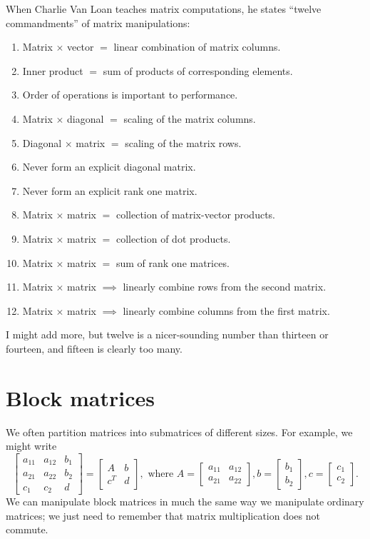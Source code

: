 \documentclass[12pt, leqno]{article}
\begin{document}
When Charlie Van Loan teaches matrix computations, he states
``twelve commandments'' of matrix manipulations:
\begin{enumerate}
\item Matrix $\times$ vector $=$ linear combination of matrix columns.
\item Inner product $=$ sum of products of corresponding elements.
\item Order of operations is important to performance.
\item Matrix $\times$ diagonal $=$ scaling of the matrix columns.
\item Diagonal $\times$ matrix $=$ scaling of the matrix rows.
\item Never form an explicit diagonal matrix.
\item Never form an explicit rank one matrix.
\item Matrix $\times$ matrix $=$ collection of matrix-vector products.
\item Matrix $\times$ matrix $=$ collection of dot products.
\item Matrix $\times$ matrix $=$ sum of rank one matrices.
\item Matrix $\times$ matrix $\implies$ linearly combine rows from
  the second matrix.
\item Matrix $\times$ matrix $\implies$ linearly combine columns from
  the first matrix.
\end{enumerate}
I might add more, but twelve is a nicer-sounding
number than thirteen or fourteen, and fifteen is clearly too many.

\section{Block matrices}

We often partition matrices into submatrices of different
sizes.  For example, we might write
\[
  \begin{bmatrix}
    a_{11} & a_{12} & b_1 \\
    a_{21} & a_{22} & b_2 \\
    c_1 & c_2 & d
  \end{bmatrix} =
  \begin{bmatrix}
    A & b \\
    c^T & d
  \end{bmatrix}, \mbox{ where }
  A = \begin{bmatrix} a_{11} & a_{12} \\ a_{21} & a_{22} \end{bmatrix},
  b = \begin{bmatrix} b_1 \\ b_2 \end{bmatrix},
  c = \begin{bmatrix} c_1 \\ c_2 \end{bmatrix}.
\]
We can manipulate block matrices in much the same way we manipulate
ordinary matrices; we just need to remember that matrix multiplication
does not commute.
\end{document}
